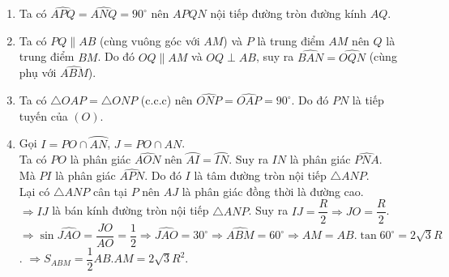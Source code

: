 \begin{ex}
{\begin{center}
\begin{tikzpicture}[scale=1.5]
\end{tikzpicture}
\end{center}
\begin{enumerate}
\item Ta có $\widehat{APQ}=\widehat{ANQ}=90^{\circ}$ nên $APQN$ nội tiếp đường tròn đường kính $AQ$.
\item Ta có $PQ\parallel AB$ (cùng vuông góc với $AM$) và $P$ là trung điểm $AM$ nên $Q$ là trung điểm $BM$. Do đó $OQ\parallel AM$ và $OQ\perp AB$, suy ra $\widehat{BAN}=\widehat{OQN}$ (cùng phụ với $\widehat{ABM}$).
\item Ta có $\triangle OAP=\triangle ONP$ (c.c.c) nên $\widehat{ONP}=\widehat{OAP}=90^{\circ}$. Do đó $PN$ là tiếp tuyến của $(O)$.
\item Gọi $I=PO\cap\wideparen{AN}$, $J=PO\cap AN$.\\
Ta có $PO$ là phân giác $\widehat{AON}$ nên $\wideparen{AI}=\wideparen{IN}$. Suy ra $IN$ là phân giác $\widehat{PNA}$.\\
Mà $PI$ là phân giác $\widehat{APN}$. Do đó $I$ là tâm đường tròn nội tiếp $\triangle ANP$.\\
Lại có $\triangle ANP$ cân tại $P$ nên $AJ$ là phân giác đồng thời là đường cao.\\
$\Rightarrow IJ$ là bán kính đường tròn nội tiếp $\triangle ANP$. Suy ra $IJ=\dfrac{R}{2}\Rightarrow JO=\dfrac{R}{2}$.\\
$\Rightarrow \sin\widehat{JAO}=\dfrac{JO}{AO}=\dfrac{1}{2}\Rightarrow \widehat{JAO}=30^{\circ}\Rightarrow \widehat{ABM}=60^{\circ}\Rightarrow AM=AB.\tan 60^{\circ}=2\sqrt{3}R$.
$\Rightarrow S_{ABM}=\dfrac{1}{2}AB.AM=2\sqrt{3}R^2$.
\end{enumerate}
}
\end{ex}

